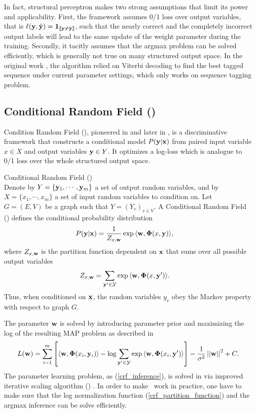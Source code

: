 {In fact, structural perceptron makes two strong assumptions that limit its power and applicability.
First, the framework assumes 0/1 loss over output variables, that is $\mathbf {\ell}(\mathbf {y},\hat{\mathbf {y}})=\mathbf {1}_{{\llbracket \mathbf {y}\neq\hat{\mathbf {y}} \rrbracket}}$, such that the nearly correct and the completely incorrect output labels will lead to the same update of the weight parameter during the training.
Secondly, it tacitly assumes that the argmax problem can be solved efficiently, which is generally not true on many structured output space.
In the original work \citep{collins02a}, the algorithm relied on Viterbi decoding to find the best tagged sequence under current parameter settings, which only works on sequence tagging problem.



%
\subsection{Conditional Random Field (\crf)}
Condition Random Field (\crf), pioneered in \citep{lafferty01} and later in \citep{taskar02}, is a discriminative framework that constructs a conditional model $P(\mathbf {y}|\mathbf {x})$ from paired input variable $x\in X$ and output variables $\mathbf {y}\in Y$.
It optimizes a log-loss which is analogue to 0/1 loss over the whole structured output space.
\begin{definition}{Conditional Random Field (\crf)}\\
	Denote by $Y=\{\mathbf {y}_1,\cdots,\mathbf {y}_m\}$ a set of output random variables, and by $X=\{x_1,\cdots,x_m\}$ a set of input random variables to condition on.
	Let $G=(E,V)$ be a graph such that $Y = (Y_v)_{v\in V}$.
	A Conditional Random Field (\crf) defines the conditional probability distribution
	\begin{align*}
		P(\mathbf {y}|\mathbf {x}) &= \frac{1}{Z_{x,\mathbf {w}}}\exp{\langle \mathbf {w}, \mathbf{\Phi}(x,\mathbf {y}) \rangle},
	\end{align*}
	where $Z_{x,\mathbf {w}}$ is the partition function dependent on $\mathbf {x}$ that sums over all possible output variables 
	\begin{align}
		Z_{x,\mathbf {w}} &= \sum_{\mathbf {y}'\in\mathcal{Y}}\exp{\langle \mathbf {w}, \mathbf{\Phi}(x,\mathbf {y}') \rangle}. \label{crf_partition_function}
	\end{align}
	Thus, when conditioned on $\mathbf {x}$, the random variables $y_v$ obey the Markov property with respect to graph $G$.
\end{definition}

The parameter $\mathbf {w}$ is solved by introducing parameter prior and maximizing the log of the resulting MAP problem as described in \citep{taskar02}
\begin{align}
	L(\mathbf {w}) = \sum_{i=1}^{m}\left[\langle \mathbf {w}, \mathbf{\Phi}(x_i,\mathbf {y}_i) \rangle-\log{\sum_{\mathbf {y}'\in\mathcal{Y}}{\exp{\langle \mathbf {w}, \mathbf{\Phi}(x_i,\mathbf {y}') \rangle}}}\right] - \frac{1}{\sigma^2}\left|\left| \mathbf {w} \right|\right|^2 + C. \label{crf_inference}
\end{align}
The parameter learning problem, as (\ref{crf_inference}), is solved in \citep{lafferty01} via improved iterative scaling algorithm (\iis) \citep{Pietra97inducing}.
In order to make \crf\ work in practice, one have to make sure that the log normalization function (\ref{crf_partition_function}) and the argmax inference can be solve efficiently.


}
